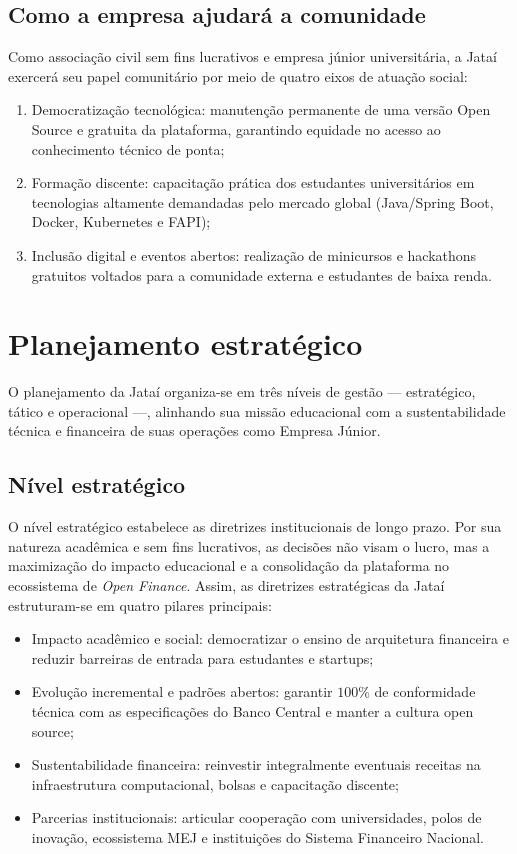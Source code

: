 \documentclass[
  12pt,
  openright,
  oneside,
  a4paper,
  brazilian
]{abntex2}
\newcommand{\openfinance}{\textit{Open Finance}}
\begin{document}
\section{Como a empresa ajudará a comunidade}
\label{sec:ajuda_comunidade}

Como associação civil sem fins lucrativos e empresa júnior universitária, a Jataí exercerá seu papel comunitário por meio de quatro eixos de atuação social:

\begin{enumerate}
    \item{Democratização tecnológica:} manutenção permanente de uma versão Open Source e gratuita da plataforma, garantindo equidade no acesso ao conhecimento técnico de ponta;
    \item{Formação discente:} capacitação prática dos estudantes universitários em tecnologias altamente demandadas pelo mercado global (Java/Spring Boot, Docker, Kubernetes e FAPI);
    \item{Inclusão digital e eventos abertos:} realização de minicursos e hackathons gratuitos voltados para a comunidade externa e estudantes de baixa renda.
\end{enumerate}

\chapter{Planejamento estratégico}
\label{cap:planejamento_estrategico}

O planejamento da Jataí organiza-se em três níveis de gestão — estratégico, tático e operacional —, alinhando sua missão educacional com a sustentabilidade técnica e financeira de suas operações como Empresa Júnior.

\section{Nível estratégico}
\label{sec:nivel_estrategico}

O nível estratégico estabelece as diretrizes institucionais de longo prazo. Por sua natureza acadêmica e sem fins lucrativos, as decisões não visam o lucro, mas a maximização do impacto educacional e a consolidação da plataforma no ecossistema de \openfinance{}. Assim, as diretrizes estratégicas da Jataí estruturam-se em quatro pilares principais:
\begin{itemize}
    \item{Impacto acadêmico e social:} democratizar o ensino de arquitetura financeira e reduzir barreiras de entrada para estudantes e startups;
    \item{Evolução incremental e padrões abertos:} garantir $100\%$ de conformidade técnica com as especificações do Banco Central e manter a cultura open source;
    \item{Sustentabilidade financeira:} reinvestir integralmente eventuais receitas na infraestrutura computacional, bolsas e capacitação discente;
    \item{Parcerias institucionais:} articular cooperação com universidades, polos de inovação, ecossistema MEJ e instituições do Sistema Financeiro Nacional.
\end{itemize}
\end{document}
